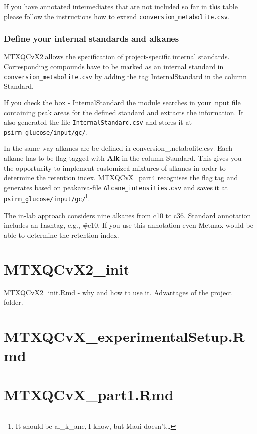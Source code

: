 \documentclass[]{book}
\let\rmarkdownfootnote\footnote%
\def\footnote{\protect\rmarkdownfootnote}
\theoremstyle{definition}
\theoremstyle{definition}
\theoremstyle{definition}
\theoremstyle{remark}
\begin{document}
If you have annotated intermediates that are not included so far in this
table please follow the instructions how to extend
\texttt{conversion\_metabolite.csv}.

\subsection{Define your internal standards and
alkanes}\label{define-your-internal-standards-and-alkanes}

MTXQCvX2 allows the specification of project-specific internal
standards. Corresponding compounds have to be marked as an internal
standard in \texttt{conversion\_metabolite.csv} by adding the tag
InternalStandard in the column Standard.

If you check the box - InternalStandard the module searches in your
input file containing peak areas for the defined standard and extracts
the information. It also generated the file
\texttt{InternalStandard.csv} and stores it at
\texttt{psirm\_glucose/input/gc/}.

In the same way alkanes are be defined in conversion\_metabolite.csv.
Each alkane has to be flag tagged with \textbf{Alk} in the column
Standard. This gives you the opportunity to implement customized
mixtures of alkanes in order to determine the retention index.
MTXQCvX\_part4 recognises the flag tag and generates based on
peakarea-file \texttt{Alcane\_intensities.csv} and saves it at
\texttt{psirm\_glucose/input/gc/}\footnote{It should be al\_k\_ane, I
  know, but Maui doesn't\ldots{}}.

The in-lab approach considers nine alkanes from c10 to c36. Standard
annotation includes an hashtag, e.g., \#c10. If you use this annotation
even Metmax would be able to determine the retention index.

\chapter{MTXQCvX2\_init}\label{init}

MTXQCvX2\_init.Rmd - why and how to use it. Advantages of the project
folder.

\chapter{MTXQCvX\_experimentalSetup.Rmd}\label{ExpSetup}

\chapter{MTXQCvX\_part1.Rmd}\label{part1}
\end{document}
